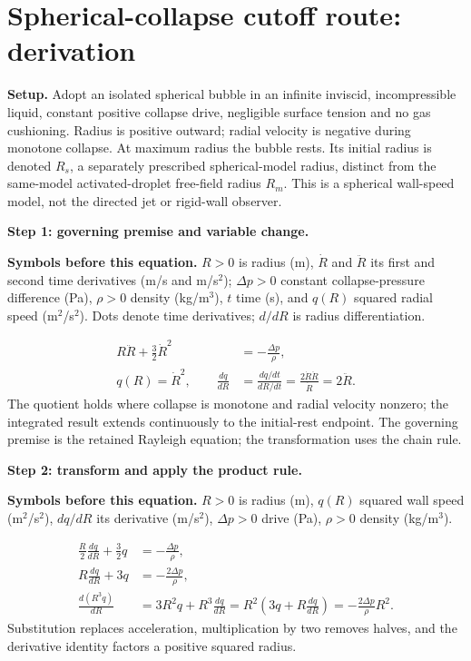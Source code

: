 \documentclass[10pt,a4paper]{article}
\newcommand{\symbols}[1]{\par\textbf{Symbols before this equation.} #1\par}
\newcommand{\nextsection}[1]{\clearpage\section{#1}}
\begin{document}
\nextsection{Spherical-collapse cutoff route: derivation}
\textbf{Setup.} Adopt an isolated spherical bubble in an infinite inviscid, incompressible liquid, constant positive collapse drive, negligible surface tension and no gas cushioning. Radius is positive outward; radial velocity is negative during monotone collapse. At maximum radius the bubble rests. Its initial radius is denoted $R_s$, a separately prescribed spherical-model radius, distinct from the same-model activated-droplet free-field radius $R_m$. This is a spherical wall-speed model, not the directed jet or rigid-wall observer.

\textbf{Step 1: governing premise and variable change.}
\symbols{$R>0$ is radius (m), $\dot R$ and $\ddot R$ its first and second time derivatives (m/s and m/s$^2$); $\Delta p>0$ constant collapse-pressure difference (Pa), $\rho>0$ density (kg/m$^3$), $t$ time (s), and $q(R)$ squared radial speed (m$^2$/s$^2$). Dots denote time derivatives; $d/dR$ is radius differentiation.}
\begin{align}
R\ddot R+\frac32\dot R^2&=-\frac{\Delta p}{\rho},\label{eq:Rayleigh}\\
q(R)=\dot R^2,\qquad \frac{dq}{dR}&=\frac{dq/dt}{dR/dt}
=\frac{2\dot R\ddot R}{\dot R}=2\ddot R.\label{eq:qchange}
\end{align}
The quotient holds where collapse is monotone and radial velocity nonzero; the integrated result extends continuously to the initial-rest endpoint. The governing premise is the retained Rayleigh equation; the transformation uses the chain rule.

\textbf{Step 2: transform and apply the product rule.}
\symbols{$R>0$ is radius (m), $q(R)$ squared wall speed (m$^2$/s$^2$), $dq/dR$ its derivative (m/s$^2$), $\Delta p>0$ drive (Pa), $\rho>0$ density (kg/m$^3$).}
\begin{align}
\frac{R}{2}\frac{dq}{dR}+\frac32q&=-\frac{\Delta p}{\rho},\nonumber\\
R\frac{dq}{dR}+3q&=-\frac{2\Delta p}{\rho},\nonumber\\
\frac{d(R^3q)}{dR}&=3R^2q+R^3\frac{dq}{dR}
=R^2\left(3q+R\frac{dq}{dR}\right)
=-\frac{2\Delta p}{\rho}R^2.\label{eq:qproduct}
\end{align}
Substitution replaces acceleration, multiplication by two removes halves, and the derivative identity factors a positive squared radius.
\end{document}
